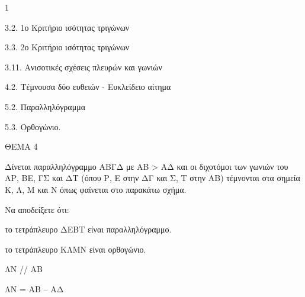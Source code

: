 \begin{ylh}{1}
    \item 3.2. 1ο Κριτήριο ισότητας τριγώνων
    \item 3.3. 2ο Κριτήριο ισότητας τριγώνων
    \item 3.11. Ανισοτικές σχέσεις πλευρών και γωνιών
    \item 4.2. Τέμνουσα δύο ευθειών - Ευκλείδειο αίτημα
    \item 5.2. Παραλληλόγραμμα
    \item 5.3. Ορθογώνιο.
\end{ylh}

ΘΕΜΑ 4

Δίνεται παραλληλόγραμμο ΑΒΓΔ με ΑΒ \textgreater{} ΑΔ και οι διχοτόμοι των γωνιών του ΑΡ, ΒΕ, ΓΣ και ΔΤ (όπου Ρ, Ε στην ΔΓ και Σ, Τ στην ΑΒ) τέμνονται στα σημεία Κ, Λ, M και N όπως φαίνεται στο παρακάτω σχήμα.

Να αποδείξετε ότι:

\begin{alist}
\item το τετράπλευρο ΔΕΒΤ είναι παραλληλόγραμμο. 

\item το τετράπλευρο ΚΛΜΝ είναι ορθογώνιο. 

\item ΛΝ // ΑΒ 

\item ΛΝ = ΑΒ -- ΑΔ 


\end{alist}
